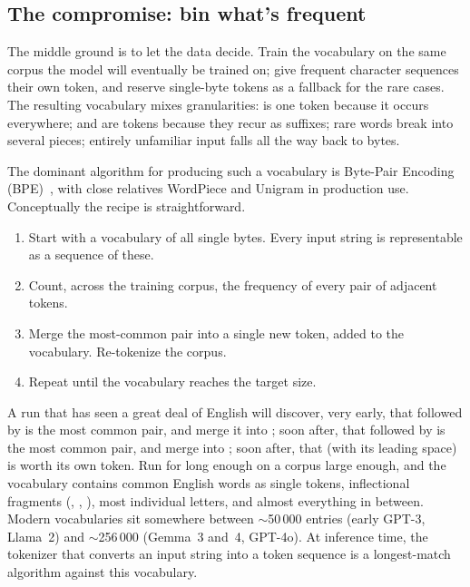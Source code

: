 \subsection{The compromise: bin what's frequent}
\label{sec:mental-tokens-compromise}

The middle ground is to let the data decide. Train the
vocabulary on the same corpus the model will eventually be
trained on; give frequent character sequences their own token,
and reserve single-byte tokens as a fallback for the rare cases.
The resulting vocabulary mixes granularities:  is one
token because it occurs everywhere;  and 
are tokens because they recur as suffixes; rare words break into
several pieces; entirely unfamiliar input falls all the way back
to bytes.

The dominant algorithm for producing such a vocabulary is
Byte-Pair Encoding (BPE)~\citep{sennrich2016bpe}, with close
relatives WordPiece and Unigram in production use. Conceptually
the recipe is straightforward.

\begin{enumerate}[label=(\arabic*),leftmargin=2em,itemsep=0.2em]
\item Start with a vocabulary of all single bytes. Every input
  string is representable as a sequence of these.
\item Count, across the training corpus, the frequency of every
  pair of adjacent tokens.
\item Merge the most-common pair into a single new token, added
  to the vocabulary. Re-tokenize the corpus.
\item Repeat until the vocabulary reaches the target size.
\end{enumerate}

\noindent
A run that has seen a great deal of English will discover, very
early, that  followed by  is the most common
pair, and merge it into ; soon after, that 
followed by  is the most common pair, and merge into
; soon after, that  (with its leading
space) is worth its own token. Run for long enough on a corpus
large enough, and the vocabulary contains common English words
as single tokens, inflectional fragments (,
, ), most individual letters, and almost
everything in between. Modern vocabularies sit somewhere between
$\sim$50\,000 entries (early GPT-3, Llama~2) and $\sim$256\,000
(Gemma~3 and~4, GPT-4o). At inference time, the tokenizer that
converts an input string into a token sequence is a
longest-match algorithm against this vocabulary.

